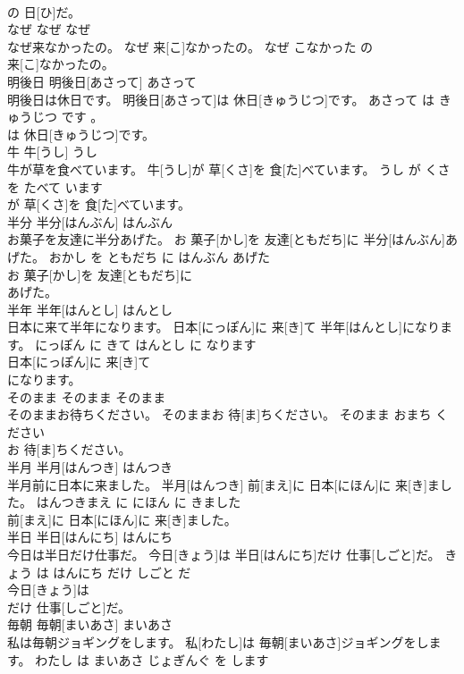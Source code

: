 \documentclass[8pt]{extreport}
\begin{document}
\begin{CJK}{UTF8}{min}
\\	の 日[ひ]だ。		
\\	なぜ	なぜ	なぜ	
\\	なぜ来なかったの。	なぜ 来[こ]なかったの。	なぜ こなかった の	
\\	来[こ]なかったの。		
\\	明後日	明後日[あさって]	あさって	
\\	明後日は休日です。	明後日[あさって]は 休日[きゅうじつ]です。	あさって は きゅうじつ です 。	
\\	は 休日[きゅうじつ]です。		
\\	牛	牛[うし]	うし	
\\	牛が草を食べています。	牛[うし]が 草[くさ]を 食[た]べています。	うし が くさ を たべて います	
\\	が 草[くさ]を 食[た]べています。		
\\	半分	半分[はんぶん]	はんぶん	
\\	お菓子を友達に半分あげた。	お 菓子[かし]を 友達[ともだち]に 半分[はんぶん]あげた。	おかし を ともだち に はんぶん あげた	
\\	お 菓子[かし]を 友達[ともだち]に
\\	あげた。		
\\	半年	半年[はんとし]	はんとし	
\\	日本に来て半年になります。	日本[にっぽん]に 来[き]て 半年[はんとし]になります。	にっぽん に きて はんとし に なります	
\\	日本[にっぽん]に 来[き]て
\\	になります。		
\\	そのまま	そのまま	そのまま	
\\	そのままお待ちください。	そのままお 待[ま]ちください。	そのまま おまち ください	
\\	お 待[ま]ちください。		
\\	半月	半月[はんつき]	はんつき	
\\	半月前に日本に来ました。	半月[はんつき] 前[まえ]に 日本[にほん]に 来[き]ました。	はんつきまえ に にほん に きました	
\\	前[まえ]に 日本[にほん]に 来[き]ました。		
\\	半日	半日[はんにち]	はんにち	
\\	今日は半日だけ仕事だ。	今日[きょう]は 半日[はんにち]だけ 仕事[しごと]だ。	きょう は はんにち だけ しごと だ	
\\	今日[きょう]は
\\	だけ 仕事[しごと]だ。		
\\	毎朝	毎朝[まいあさ]	まいあさ	
\\	私は毎朝ジョギングをします。	私[わたし]は 毎朝[まいあさ]ジョギングをします。	わたし は まいあさ じょぎんぐ を します	

\end{CJK}
\end{document}
